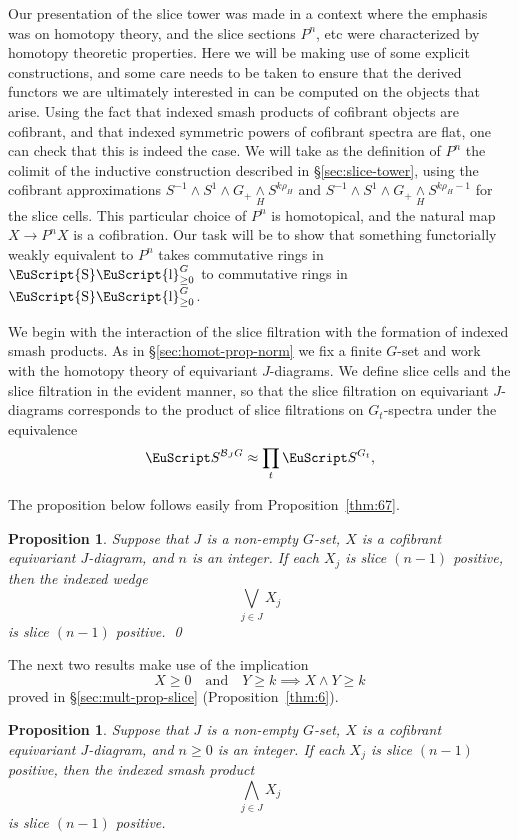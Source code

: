 \documentclass{amsart}
\newtheorem{prop}[equation]{Proposition}
\theoremstyle{definition}
\theoremstyle{remark}
\newcommand{\spectra}{\EuScript S}
\DeclareMathOperator{\slicesymbol}{\EuScript{S}\EuScript{l}}
\newcommand{\geslice}[1]{\slicesymbol^{G}_{\ge{#1}}}
\newcommand{\smashove}[1]{\underset{#1}{\wedge}}
\newcommand{\ugspectra}[1]{\spectra^{#1}}
\newcommand{\cat}[1]{{\mathcal #1}}
\begin{document}
Our presentation of the slice tower was made in a context where the
emphasis was on homotopy theory, and the slice sections $P^{n}$, etc
were characterized by homotopy theoretic properties.  Here we will be
making use of some explicit constructions, and some care needs to be
taken to ensure that the derived functors we are ultimately interested
in can be computed on the objects that arise.  Using the fact that
indexed smash products of cofibrant objects are cofibrant, and that
indexed symmetric powers of cofibrant spectra are flat, one can check
that this is indeed the case.  We will take as the definition of
$P^{n}$ the colimit of the inductive construction described in
\S\ref{sec:slice-tower}, using the cofibrant approximations
$S^{-1}\wedge S^{1}\wedge G_{+}\smashove{H}S^{k\rho_{H}}$ and
$S^{-1}\wedge S^{1}\wedge G_{+}\smashove{H}S^{k\rho_{H}-1}$ for the
slice cells.  This particular choice of $P^{n}$ is homotopical, and
the natural map $X\to P^{n}X$ is a cofibration.  Our task will be to
show that something functorially weakly equivalent to $P^{n}$ takes
commutative rings in $\geslice{0}$ to commutative rings in
$\geslice{0}$.

We begin with the interaction of the slice filtration with the
formation of indexed smash products.  As in
\S\ref{sec:homot-prop-norm} we fix a finite $G$-set and work with the
homotopy theory of equivariant $J$-diagrams.  We define slice cells
and the slice filtration in the evident manner, so that the slice
filtration on equivariant $J$-diagrams corresponds to the product of
slice filtrations on $G_{t}$-spectra under the equivalence
\[
\spectra^{\cat{B}_{J}G} \approx \prod_{t}\ugspectra{G_{t}},
\]

The proposition below follows easily from Proposition~\ref{thm:67}.  

\begin{prop}
\label{thm:99} Suppose that $J$ is a non-empty $G$-set, $X$ is a
cofibrant equivariant $J$-diagram, and $n$ is an integer.  If each
$X_{j}$ is slice $(n-1)$ positive, then the indexed wedge
\[
\bigvee_{j\in J} X_{j}
\]
is slice $(n-1)$ positive.  \qed
\end{prop}

The next two results make use of the implication
\begin{equation}
\label{eq:93}
X\ge 0\quad\text{and}\quad Y\ge k\implies X\wedge Y\ge k
\end{equation}
proved in \S\ref{sec:mult-prop-slice} (Proposition~\ref{thm:6}).

\begin{prop}
\label{thm:98} Suppose that $J$ is a non-empty $G$-set, $X$ is a
cofibrant equivariant $J$-diagram, and $n\ge 0$ is an integer.  If
each $X_{j}$ is slice $(n-1)$ positive, then the indexed smash product
\[
\bigwedge_{j\in J} X_{j}
\]
is slice $(n-1)$ positive.  
\end{prop}
\end{document}
